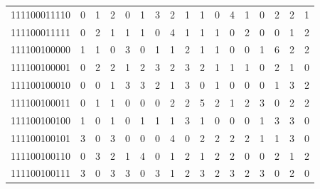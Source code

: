 \documentclass[10pt,a4paper]{article}
\begin{document}
\begin{longtable}{ |c|c|c|c|c|c|c|c|c|c|c|c|c|c|c|c|c| }
    111100011110              & 0                            & 1                                & 2                            & 0                              & 1   & 3   & 2   & 1   & 1   & 0   & 4   & 1   & 0   & 2   & 2   & 1   \\
    111100011111              & 0                            & 2                                & 1                            & 1                              & 1   & 0   & 4   & 1   & 1   & 1   & 0   & 2   & 0   & 0   & 1   & 2   \\
    111100100000              & 1                            & 1                                & 0                            & 3                              & 0   & 1   & 1   & 2   & 1   & 1   & 0   & 0   & 1   & 6   & 2   & 2   \\
    111100100001              & 0                            & 2                                & 2                            & 1                              & 2   & 3   & 2   & 3   & 2   & 1   & 1   & 1   & 0   & 2   & 1   & 0   \\
    111100100010              & 0                            & 0                                & 1                            & 3                              & 3   & 2   & 1   & 3   & 0   & 1   & 0   & 0   & 0   & 1   & 3   & 2   \\
    111100100011              & 0                            & 1                                & 1                            & 0                              & 0   & 0   & 2   & 2   & 5   & 2   & 1   & 2   & 3   & 0   & 2   & 2   \\
    111100100100              & 1                            & 0                                & 1                            & 0                              & 1   & 1   & 1   & 3   & 1   & 0   & 0   & 0   & 1   & 3   & 3   & 0   \\
    111100100101              & 3                            & 0                                & 3                            & 0                              & 0   & 0   & 4   & 0   & 2   & 2   & 2   & 2   & 1   & 1   & 3   & 0   \\
    111100100110              & 0                            & 3                                & 2                            & 1                              & 4   & 0   & 1   & 2   & 1   & 2   & 2   & 0   & 0   & 2   & 1   & 2   \\
    111100100111              & 3                            & 0                                & 3                            & 3                              & 0   & 3   & 1   & 2   & 3   & 2   & 3   & 2   & 3   & 0   & 2   & 0   \\

\end{longtable}
\end{document}
